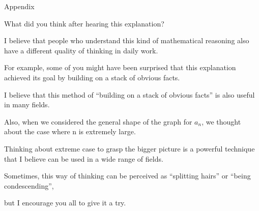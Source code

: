 %
%


\begin{frame}[c]{}{}
  {\large Appendix}
\end{frame}

\begin{frame}[c]{}{}
  What did you think after hearing this explanation?

  \vspace{2ex}

  I believe that people who understand this kind of mathematical reasoning also have a different quality of thinking in daily work.
\end{frame}

\begin{frame}[c]{}{}
  For example, some of you might have been surprised that this explanation achieved its goal by building on a stack of obvious facts.
\end{frame}

\begin{frame}[c]{}{}
  I believe that this method of ``building on a stack of obvious facts'' is also useful in many fields.
\end{frame}

\begin{frame}[c]{}{}
  Also, when we considered the general shape of the graph for $a_n$, we thought about the case where n is extremely large.
\end{frame}

\begin{frame}[c]{}{}
  Thinking about extreme case to grasp the bigger picture is a powerful technique that I believe can be used in a wide range of fields.
\end{frame}

\begin{frame}[c]{}{}
  Sometimes, this way of thinking can be perceived as ``splitting hairs'' or ``being condescending'',

  \vspace{2ex}

  but I encourage you all to give it a try.
\end{frame}
